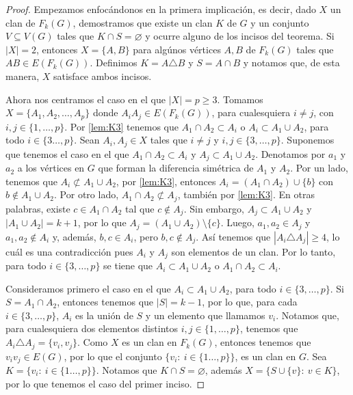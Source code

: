 \begin{proof}
    Empezamos enfoc\'andonos en la primera implicaci\'on, es decir, dado $X$ un
    clan de $F_k(G)$, demostramos que existe un clan $K$ de $G$ y un conjunto $V
    \subseteq V(G)$ tales que $K \cap S = \varnothing$ y ocurre alguno de los
    incisos del teorema. Si $|X|=2$, entonces $X= \{A, B\}$ para alg\'unos
    v\'ertices $A, B$ de $F_k(G)$ tales que $AB \in E(F_k(G))$. Definimos $K = A
    \triangle B$ y $S=A \cap B$ y notamos que, de esta manera, $X$ satisface ambos
    incisos.

    Ahora nos centramos el caso en el que $|X|= p \geq 3$. Tomamos $X=\{A_1, A_2,
    \dots, A_p\}$ donde $A_i{A_j} \in E(F_k(G))$, para cualesquiera $i\neq j$,
    con $i,j \in \{1, \dots, p\}$. Por \cref{lem:K3} tenemos que $A_1\cap A_2
    \subset A_i$ o $A_i \subset A_1 \cup A_2$, para todo $i \in \{3 \dots,p \}$.
    Sean $A_i, A_j \in X$ tales que $i \neq j$ y $i, j \in \{3, \dots, p\}$.
    Suponemos que tenemos el caso en el que $A_1\cap A_2 \subset A_i$ y $A_j
    \subset A_1 \cup A_2$. Denotamos por $a_1$ y $a_2$ a los v\'ertices en $G$
    que forman la diferencia sim\'etrica de $A_1$ y $A_2$. Por un lado, tenemos
    que $A_i \not\subset A_1\cup A_2$, por \cref{lem:K3}, entonces $A_i =
    (A_1\cap A_2) \cup \{b\}$ con $b \notin A_1\cup A_2$. Por otro lado, $A_1 \cap A_2 \not\subset A_j$, tambi\'en por \cref{lem:K3}. En otras
    palabras, existe $c \in A_1 \cap A_2$ tal que $c \notin A_j$. Sin embargo,
    $A_j \subset A_1 \cup A_2$ y $|A_1 \cup A_2| =k+1$, por lo que $A_j = (A_1
    \cup A_2)\setminus \{c\}$. Luego, $a_1, a_2 \in A_j$ y $a_1, a_2 \notin
    A_i$ y, adem\'as, $b, c \in A_i$, pero $b, c \notin A_j$. As\'i tenemos que
    $|A_i \triangle A_j| \geq 4$, lo cu\'al es una contradicci\'on pues $A_i$ y
    $A_j$ son elementos de un clan. Por lo tanto, para todo $i\in \{3, \dots,
    p\}$ se tiene que $A_i \subset A_1\cup A_2$ o $A_1 \cap A_2 \subset A_i$.

    Consideramos primero el caso en el que $A_i \subset A_1\cup A_2$, para todo
    $i\in \{3, \dots, p\}$. Si $S= A_1 \cap A_2$, entonces tenemos que $|S|
    =k-1$, por lo que, para cada $i \in \{3, \dots, p\}$, $A_i$ es la uni\'on de
    $S$ y un elemento que llamamos $v_i$. Notamos que, para cualesquiera dos
    elementos distintos $i, j \in \{1, \dots, p\}$, tenemos que $A_i \triangle
    A_j = \{v_i, v_j\}$. Como $X$ es un clan en $F_k(G)$, entonces tenemos que
    $v_i{v_j} \in E(G)$, por lo que el conjunto $\{v_i\colon\ i \in \{1 \dots,
    p\}\}$, es un clan en $G$.   Sea $K = \{v_i\colon\ i \in \{1 \dots, p\}\}$.
    Notamos que  $K \cap S = \varnothing$, adem\'as $X= \{S \cup \{v\}\colon\ v
    \in K\}$, por lo que tenemos el caso del primer inciso.


\end{proof}
